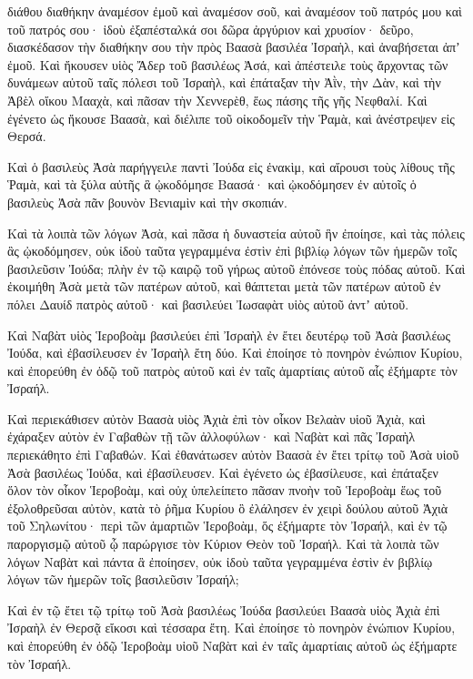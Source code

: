 {διάθου διαθήκην ἀναμέσον ἐμοῦ καὶ ἀναμέσον σοῦ, καὶ ἀναμέσον τοῦ πατρός μου καὶ τοῦ πατρός σου· ἰδοὺ ἐξαπέσταλκά σοι δῶρα ἀργύριον καὶ χρυσίον· δεῦρο, διασκέδασον τὴν διαθήκην σου τὴν πρὸς Βαασὰ βασιλέα Ἰσραὴλ, καὶ ἀναβήσεται ἀπʼ ἐμοῦ.
Καὶ ἤκουσεν υἱὸς Ἄδερ τοῦ βασιλέως Ἀσά, καὶ ἀπέστειλε τοὺς ἄρχοντας τῶν δυνάμεων αὐτοῦ ταῖς πόλεσι τοῦ Ἰσραὴλ, καὶ ἐπάταξαν τὴν Ἀῒν, τὴν Δὰν, καὶ τὴν Ἀβὲλ οἴκου Μααχὰ, καὶ πᾶσαν τὴν Χεννερὲθ, ἕως πάσης τῆς γῆς Νεφθαλί.
Καὶ ἐγένετο ὡς ἤκουσε Βαασὰ, καὶ διέλιπε τοῦ οἰκοδομεῖν τὴν Ῥαμὰ, καὶ ἀνέστρεψεν εἰς Θερσά.
\par }{\PP {}Καὶ ὁ βασιλεὺς Ἀσὰ παρήγγειλε παντὶ Ἰούδα εἰς ἐνακὶμ, καὶ αἴρουσι τοὺς λίθους τῆς Ῥαμὰ, καὶ τὰ ξύλα αὐτῆς ἃ ᾠκοδόμησε Βαασά· καὶ ᾠκοδόμησεν ἐν αὐτοῖς ὁ βασιλεὺς Ἀσὰ πᾶν βουνὸν Βενιαμὶν καὶ τὴν σκοπιάν.
\par }{\PP {}Καὶ τὰ λοιπὰ τῶν λόγων Ἀσὰ, καὶ πᾶσα ἡ δυναστεία αὐτοῦ ἣν ἐποίησε, καὶ τὰς πόλεις ἃς ᾠκοδόμησεν, οὐκ ἰδοὺ ταῦτα γεγραμμένα ἐστὶν ἐπὶ βιβλίῳ λόγων τῶν ἡμερῶν τοῖς βασιλεῦσιν Ἰούδα; πλὴν ἐν τῷ καιρῷ τοῦ γήρως αὐτοῦ ἐπόνεσε τοὺς πόδας αὐτοῦ.
Καὶ ἐκοιμήθη Ἀσὰ μετὰ τῶν πατέρων αὐτοῦ, καὶ θάπτεται μετὰ τῶν πατέρων αὐτοῦ ἐν πόλει Δαυίδ πατρὸς αὐτοῦ· καὶ βασιλεύει Ἰωσαφὰτ υἱὸς αὐτοῦ ἀντʼ αὐτοῦ.
\par }{\PP {}Καὶ Ναβὰτ υἱὸς Ἱεροβοὰμ βασιλεύει ἐπὶ Ἰσραὴλ ἐν ἔτει δευτέρῳ τοῦ Ἀσὰ βασιλέως Ἰούδα, καὶ ἐβασίλευσεν ἐν Ἰσραὴλ ἔτη δύο.
Καὶ ἐποίησε τὸ πονηρὸν ἐνώπιον Κυρίου, καὶ ἐπορεύθη ἐν ὁδῷ τοῦ πατρὸς αὐτοῦ καὶ ἐν ταῖς ἁμαρτίαις αὐτοῦ αἷς ἐξήμαρτε τὸν Ἰσραήλ.
\par }{\PP {}Καὶ περιεκάθισεν αὐτὸν Βαασὰ υἱὸς Ἀχιὰ ἐπὶ τὸν οἶκον Βελαὰν υἱοῦ Ἀχιὰ, καὶ ἐχάραξεν αὐτὸν ἐν Γαβαθὼν τῇ τῶν ἀλλοφύλων· καὶ Ναβὰτ καὶ πᾶς Ἰσραὴλ περιεκάθητο ἐπὶ Γαβαθών.
Καὶ ἐθανάτωσεν αὐτὸν Βαασὰ ἐν ἔτει τρίτῳ τοῦ Ἀσὰ υἱοῦ Ἀσὰ βασιλέως Ἰούδα, καὶ ἐβασίλευσεν.
Καὶ ἐγένετο ὡς ἐβασίλευσε, καὶ ἐπάταξεν ὅλον τὸν οἶκον Ἱεροβοὰμ, καὶ οὐχ ὑπελείπετο πᾶσαν πνοὴν τοῦ Ἱεροβοὰμ ἕως τοῦ ἐξολοθρεῦσαι αὐτὸν, κατὰ τὸ ῥῆμα Κυρίου ὃ ἐλάλησεν ἐν χειρὶ δούλου αὐτοῦ Ἀχιὰ τοῦ Σηλωνίτου·
περὶ τῶν ἁμαρτιῶν Ἱεροβοὰμ, ὅς ἐξήμαρτε τὸν Ἰσραήλ, καὶ ἐν τῷ παροργισμῷ αὐτοῦ ᾧ παρώργισε τὸν Κύριον Θεὸν τοῦ Ἰσραήλ.
Καὶ τὰ λοιπὰ τῶν λόγων Ναβὰτ καὶ πάντα ἃ ἐποίησεν, οὐκ ἰδοὺ ταῦτα γεγραμμένα ἐστὶν ἐν βιβλίῳ λόγων τῶν ἡμερῶν τοῖς βασιλεῦσιν Ἰσραήλ;
\par }{\PP {}Καὶ ἐν τῷ ἔτει τῷ τρίτῳ τοῦ Ἀσὰ βασιλέως Ἰούδα βασιλεύει Βαασὰ υἱὸς Ἀχιὰ ἐπὶ Ἰσραὴλ ἐν Θερσᾷ εἴκοσι καὶ τέσσαρα ἔτη.
Καὶ ἐποίησε τὸ πονηρὸν ἐνώπιον Κυρίου, καὶ ἐπορεύθη ἐν ὁδῷ Ἱεροβοὰμ υἱοῦ Ναβὰτ καὶ ἐν ταῖς ἁμαρτίαις αὐτοῦ ὡς ἐξήμαρτε τὸν Ἰσραήλ.

}
